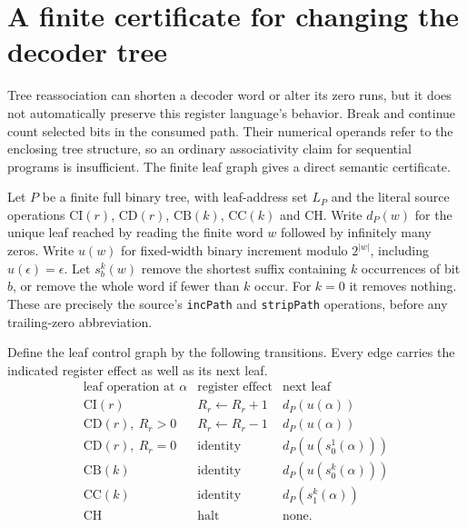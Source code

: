 \section{A finite certificate for changing the decoder tree}
\label{sec:leaf-cfg-transfer}

Tree reassociation can shorten a decoder word or alter its zero runs,
but it does not automatically preserve this register language's behavior.
Break and continue count selected bits in the consumed path.  Their
numerical operands refer to the enclosing tree structure, so an ordinary
associativity claim for sequential programs is insufficient.
The finite leaf graph gives a direct semantic certificate.

Let $P$ be a finite full binary tree, with leaf-address set $L_P$ and the
literal source operations $\mathrm{CI}(r)$, $\mathrm{CD}(r)$,
$\mathrm{CB}(k)$, $\mathrm{CC}(k)$ and $\mathrm{CH}$.
Write $d_P(w)$ for the unique leaf reached by reading the finite word
$w$ followed by infinitely many zeros.  Write $u(w)$ for fixed-width
binary increment modulo $2^{|w|}$, including $u(\epsilon)=\epsilon$.
Let $s_b^k(w)$ remove the shortest suffix containing $k$ occurrences of
bit $b$, or remove the whole word if fewer than $k$ occur.  For $k=0$
it removes nothing.  These are precisely the source's
\texttt{incPath} and \texttt{stripPath} operations, before any
trailing-zero abbreviation.

Define the leaf control graph by the following transitions.  Every
edge carries the indicated register effect as well as its next leaf.
\[
\begin{array}{c|c|c}
\text{leaf operation at }\alpha&\text{register effect}&\text{next leaf}\\\hline
\mathrm{CI}(r)&R_r\gets R_r+1&d_P(u(\alpha))\\
\mathrm{CD}(r),\ R_r>0&R_r\gets R_r-1&d_P(u(\alpha))\\
\mathrm{CD}(r),\ R_r=0&\text{identity}&d_P(u(s_0^1(\alpha)))\\
\mathrm{CB}(k)&\text{identity}&d_P(u(s_0^k(\alpha)))\\
\mathrm{CC}(k)&\text{identity}&d_P(s_1^k(\alpha))\\
\mathrm{CH}&\text{halt}&\text{none}.
\end{array}
\]

